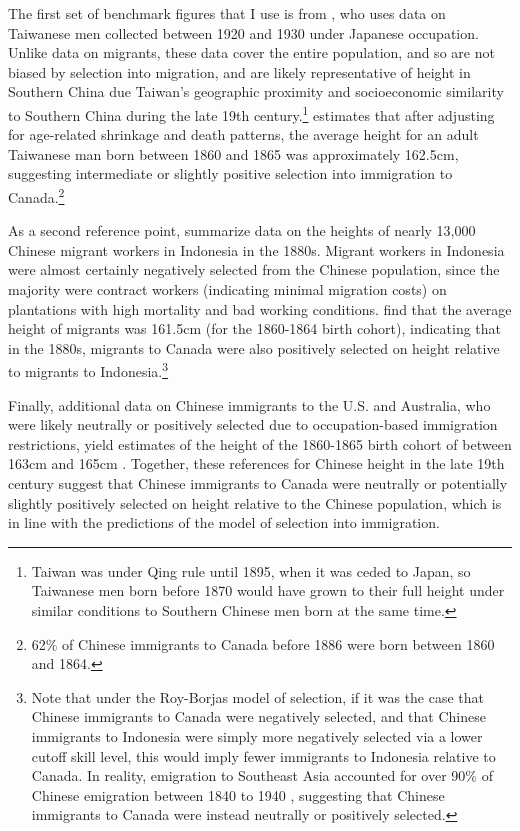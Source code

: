 The first set of benchmark figures that I use is from \citet{olds2003}, who uses data on Taiwanese men collected between 1920 and 1930 under Japanese occupation. Unlike data on migrants, these data cover the entire population, and so are not biased by selection into migration, and are likely representative of height in Southern China due Taiwan's geographic proximity and socioeconomic similarity to Southern China during the late 19th century.\footnote{Taiwan was under Qing rule until 1895, when it was ceded to Japan, so Taiwanese men born before 1870 would have grown to their full height under similar conditions to Southern Chinese men born at the same time.} 
\citet{olds2003} estimates that after adjusting for age-related shrinkage and death patterns, the average height for an adult Taiwanese man born between 1860 and 1865 was approximately 162.5cm, suggesting intermediate or slightly positive selection into immigration to Canada.\footnote{62\% of Chinese immigrants to Canada before 1886 were born between 1860 and 1864.}

As a second reference point, \citet{batenhira2008} summarize data on the heights of nearly 13,000 Chinese migrant workers in Indonesia in the 1880s. Migrant workers in Indonesia were almost certainly negatively selected from the Chinese population, since the majority were contract workers (indicating minimal migration costs) on plantations with high mortality and bad working conditions. \citet{batenhira2008} find that the average height of migrants was 161.5cm (for the 1860-1864 birth cohort), indicating that in the 1880s, migrants to Canada were also positively selected on height relative to migrants to Indonesia.\footnote{Note that under the Roy-Borjas model of selection, if it was the case that Chinese immigrants to Canada were negatively selected, and that Chinese immigrants to Indonesia were simply more negatively selected via a lower cutoff skill level, this would imply fewer immigrants to Indonesia relative to Canada. 
In reality, emigration to Southeast Asia accounted for over 90\% of Chinese emigration between 1840 to 1940 \citep{mckeown2010}, suggesting that Chinese immigrants to Canada were instead neutrally or positively selected.}

Finally, additional data on Chinese immigrants to the U.S. and Australia, who were likely neutrally or positively selected due to occupation-based immigration restrictions, yield estimates of the height of the 1860-1865 birth cohort of between 163cm and 165cm \citep{morgan2004,carson2006,morgan2009}. Together, these references for Chinese height in the late 19th century suggest that Chinese immigrants to Canada were neutrally or potentially slightly positively selected on height relative to the Chinese population, which is in line with the predictions of the \citet{chiquiarhanson2005} model of selection into immigration.


